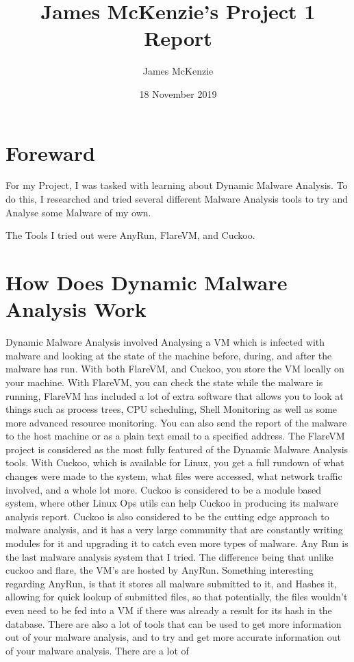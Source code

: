 \documentclass{article}
\begin{document}
\title{James McKenzie's Project 1 Report}
\author{James McKenzie}
\date{18 November 2019}
\maketitle

\newpage
\section*{Foreward}
For my Project, I was tasked with learning about Dynamic Malware Analysis. To
do this, I researched and tried several different Malware Analysis tools to 
try and Analyse some Malware of my own.

The Tools I tried out were AnyRun, FlareVM, and Cuckoo.


\section*{How Does Dynamic Malware Analysis Work}
Dynamic Malware Analysis involved Analysing a VM which is infected with 
 malware and looking at the state of the machine before, during, and 
 after the malware has run. With both FlareVM, and Cuckoo, you store the 
 VM locally on your machine. With FlareVM, you can check the state while
 the malware is running, FlareVM has included a lot of extra software that 
 allows you to look at things such as process trees, CPU scheduling, 
 Shell Monitoring as well as some more advanced resource monitoring. You 
 can also send the report of the malware to the host machine or as a
 plain text email to a specified address. The FlareVM project is considered
 as the most fully featured of the Dynamic Malware Analysis tools.
 With Cuckoo, which is available for Linux,  you get a full rundown of what
 changes were made to the system, what files were accessed, what network
 traffic involved, and a whole lot more. Cuckoo is considered to be a module
 based system, where other Linux Ops utils can help Cuckoo in producing its 
 malware analysis report. Cuckoo is also considered to be the cutting edge
 approach to malware analysis, and it has a very large community that are
 constantly writing modules for it and upgrading it to catch even more types
 of malware.
 Any Run is the last malware analysis system that I tried. The difference being
 that unlike cuckoo and flare, the VM's are hosted by AnyRun. Something interesting
  regarding AnyRun, is that it stores all malware submitted to it, and Hashes
  it, allowing for quick lookup of submitted files, so that potentially, the 
  files wouldn't even need to be fed into a VM if there was already a result
  for its hash in the database. There are also a lot of tools that can be used 
  to get more information out of your malware analysis, and to try and get
 more accurate information out of your malware analysis. There are a lot of 
\end{document}
